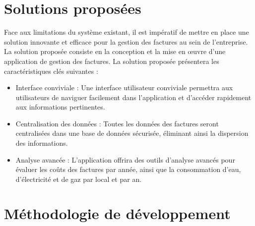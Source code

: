 \documentclass[12pt]{report}
\begin{document}
\section{Solutions proposées}
Face aux limitations du système existant, il est impératif de mettre en place une solution innovante et efficace pour la gestion des factures au sein de l'entreprise. La solution proposée consiste en la conception et la mise en œuvre d'une application de gestion des factures.
La solution proposée présentera les caractéristiques clés suivantes :
\begin{itemize}[label={$\bullet$}]
	\item Interface conviviale : Une interface utilisateur conviviale permettra aux \mbox{utilisateurs} de naviguer facilement dans l'application et d'accéder rapidement aux \mbox{informations} pertinentes.
	\item Centralisation des données : Toutes les données des factures seront \mbox{centralisées} dans une base de données sécurisée, éliminant ainsi la dispersion des \mbox{informations}.
	\item Analyse avancée : L'application offrira des outils d'analyse avancés pour évaluer les coûts des factures par année, ainsi que la consommation d'eau, d'électricité et de gaz par local et par an.
\end{itemize}
\section{Méthodologie de développement}
\end{document}

